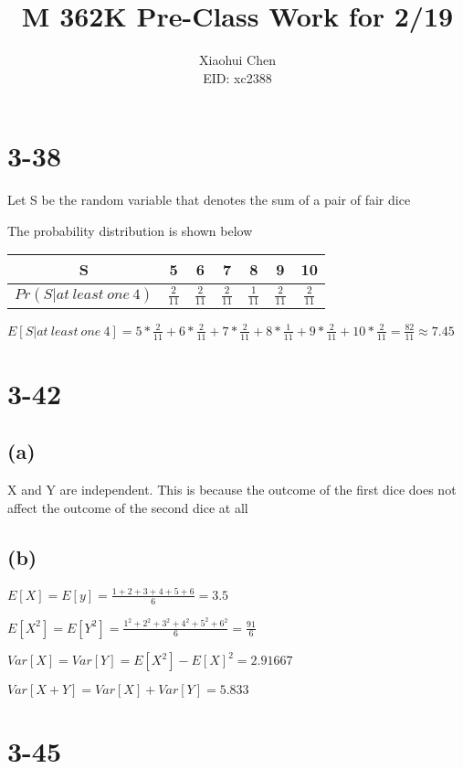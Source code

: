 \documentclass[12pt]{article}
\author{Xiaohui Chen \\EID: xc2388}
\title{M 362K Pre-Class Work for 2/19}
\begin{document}
\maketitle
\begin{spacing}{2.0}

\section*{3-38}

Let S be the random variable that denotes the sum of a pair of fair dice

The probability distribution is shown below

\begin{tabular}{|c|c|c|c|c|c|c|}
  \hline
  S & 5 & 6 & 7 & 8 & 9 & 10 \\
  \hline
  $Pr(S|at\ least\ one\ 4)$ & $\frac{2}{11}$ & $\frac{2}{11}$ & $\frac{2}{11}$ & $\frac{1}{11}$ & $\frac{2}{11}$ & $\frac{2}{11}$ \\
  \hline
\end{tabular}

$E[S|at\ least\ one\ 4]= 5*\frac{2}{11} + 6*\frac{2}{11} + 7*\frac{2}{11}+ 8*\frac{1}{11}+ 9*\frac{2}{11} + 10*\frac{2}{11} = \frac{82}{11} \approx 7.45$

\section*{3-42}

\subsection*{(a)}

X and Y are independent. This is because the outcome of the first dice does not affect the outcome of the second dice at all

\subsection*{(b)}

$E[X]=E[y]=\frac{1+2+3+4+5+6}{6}=3.5$

$E[X^2]= E[Y^2]= \frac{1^2+2^2+3^2+4^2+5^2+6^2}{6}= \frac{91}{6}$

$Var[X]=Var[Y]= E[X^2]- E[X]^2= 2.91667$

$Var[X+Y]= Var[X]+Var[Y]= 5.833$

\section*{3-45}


\end{spacing}
\end{document}
